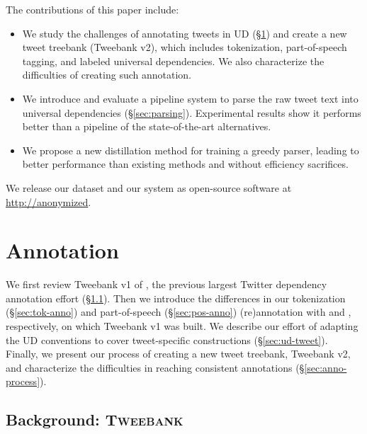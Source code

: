 \documentclass[11pt,a4paper]{article}
\newcommand{\yicomment}[1]{\textcolor{gray}{[#1 ---\textsc{yi}]}}
\begin{document}
The contributions of this paper include:
\begin{itemize}
\item We study the challenges of annotating tweets in UD (\S\ref{sec:anno})
and create a new tweet treebank ({\sc Tweebank v2}), which includes 
tokenization, part-of-speech tagging, and labeled universal dependencies.
We also characterize the difficulties of creating such annotation.

\item We introduce and evaluate a pipeline system to parse the raw tweet text into
universal dependencies (\S\ref{sec:parsing}).  Experimental results show
it performs better than a pipeline of the state-of-the-art alternatives.

\item We propose a new distillation
method for training a greedy parser, leading to better performance
than existing methods and without efficiency sacrifices.
\end{itemize}

We release our dataset and our system as open-source software at
\url{http://anonymized}. 


\section{Annotation}\label{sec:anno}

We first review {\sc Tweebank v1} of \citet{kong-EtAl:2014:EMNLP2014},
the previous largest Twitter dependency annotation effort 
(\S\ref{sec:tweebank}).
Then we introduce the differences in our tokenization
(\S\ref{sec:tok-anno}) and part-of-speech (\S\ref{sec:pos-anno}) (re)annotation with \citet{ICWSM101540} and 
\citet{gimpel-EtAl:2011:ACL-HLT2011}, respectively, on which {\sc Tweebank v1} was built. 
We describe our effort of adapting the
UD conventions to cover tweet-specific constructions (\S\ref{sec:ud-tweet}). 
Finally, we present our process of creating a new tweet treebank, {\sc
  Tweebank v2}, and characterize
the difficulties in reaching consistent annotations (\S\ref{sec:anno-process}).

\subsection{Background: \textsc{Tweebank}}\label{sec:tweebank}
\end{document}
